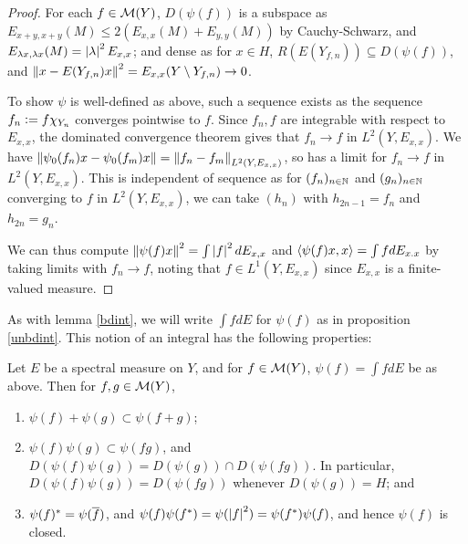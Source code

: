 \documentclass[10pt]{amsart}
\begin{document}
\begin{proof}
    For each $f \in \mathcal{M}(Y)$, $D(\psi(f))$ is a subspace as $E_{x + y, x + y}(M) \leq 2(E_{x, x}(M) + E_{y, y}(M))$ by Cauchy-Schwarz, and $E_{\lambda x, \lambda x}(M) = \left| \lambda \right|^2E_{x, x}$; and dense as for $x \in H$, $R(E(Y_{f, n})) \subseteq D(\psi(f))$, and $\left\| x - E(Y_{f, n})x \right\|^2 = E_{x, x}(Y \setminus Y_{f, n}) \to 0$. 
    
    To show $\psi$ is well-defined as above, such a sequence exists as the sequence $f_n \vcentcolon= f \chi_{Y_n}$ converges pointwise to $f$. Since $f_n, f$ are integrable with respect to $E_{x, x}$, the dominated convergence theorem gives that $f_n \to f$ in $L^2(Y, E_{x, x})$. We have $\left\| \psi_0(f_n)x - \psi_0(f_m)x \right\| = \left\| f_n - f_m \right\|_{L^2(Y, E_{x, x})}$, so has a limit for $f_n \to f$ in $L^2(Y, E_{x, x})$. This is independent of sequence as for $(f_n)_{n \in \mathbb{N}}$ and $(g_n)_{n \in \mathbb{N}}$ converging to $f$ in $L^2(Y, E_{x, x})$, we can take $(h_n)$ with $h_{2n - 1} = f_n$ and $h_{2n} = g_n$. 

    We can thus compute $\left\| \psi(f)x \right\|^2 = \int \left| f \right|^2dE_{x, x}$ and $\left\langle \psi(f)x, x \right\rangle = \int f dE_{x. x}$ by taking limits with $f_n \to f$, noting that $f \in L^1(Y, E_{x, x})$ since $E_{x, x}$ is a finite-valued measure.
\end{proof}
As with lemma \ref{bdint}, we will write $\int f dE$ for $\psi(f)$ as in proposition \ref{unbdint}. This notion of an integral has the following properties:
\begin{proposition}\label{psiprops}
    Let $E$ be a spectral measure on $Y$, and for $f \in \mathcal{M}(Y)$, $\psi(f) = \int f dE$ be as above. Then for $f, g \in \mathcal{M}(Y)$,
    \begin{enumerate}
        \item $\psi(f) + \psi(g) \subset \psi(f + g)$;
        \item $\psi(f)\psi(g) \subset \psi(fg)$, and $D(\psi(f)\psi(g)) = D(\psi(g)) \cap D(\psi(fg))$. In particular, $D(\psi(f)\psi(g)) = D(\psi(fg))$ whenever $D(\psi(g)) = H$; and
        \item $\psi(f)^* = \psi(\overline{f})$, and $\psi(f)\psi(f^*) = \psi(\left| f \right|^2) = \psi(f^*)\psi(f)$, and hence $\psi(f)$ is closed.
    \end{enumerate}
\end{proposition}
\end{document}

